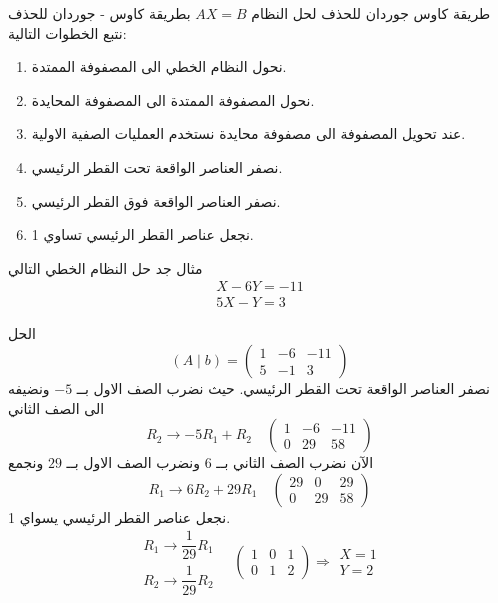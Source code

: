 	\begin{frame}
		\begin{exampleblock}{طريقة كاوس جوردان للحذف}
			لحل النظام $AX=B$ بطريقة كاوس - جوردان للحذف نتبع الخطوات التالية:
			\begin{enumerate}
				\item نحول النظام الخطي الى المصفوفة الممتدة.
				\item نحول المصفوفة الممتدة الى المصفوفة المحايدة.
				\item عند تحويل المصفوفة الى مصفوفة محايدة نستخدم العمليات الصفية الاولية.
				\item نصفر العناصر الواقعة تحت القطر الرئيسي.
				\item نصفر العناصر الواقعة فوق القطر الرئيسي.
				\item نجعل عناصر القطر الرئيسي تساوي 1.
			\end{enumerate}
		\end{exampleblock}
		
		\begin{exampleblock}{مثال}
			جد حل النظام الخطي التالي
			\begin{align*}
				X-6Y = -11\\
				5X - Y = 3
			\end{align*}
		\end{exampleblock}
	\end{frame}
	
	\begin{frame}
		\begin{exampleblock}{الحل}
			\[
			(A\mid b) =
			\left(
			\begin{array}{cc|c}
				1&-6&-11\\
				5&-1&3
			\end{array}
			\right)
			\]
			نصفر العناصر الواقعة تحت القطر الرئيسي. حيث نضرب الصف الاول بــ $-5$ ونضيفه الى الصف الثاني
			\[
			R_2\to-5R_1 + R_2  \quad 
			\left(
			\begin{array}{cc|c}
				1&-6&-11\\
				0&29&58
			\end{array}
			\right)
			\]
			الآن نضرب الصف الثاني بــ $6$ ونضرب الصف الاول بــ $29$ ونجمع
			\[
			R_1 \to 6R_2 + 29R_1 \quad
			\left(
			\begin{array}{cc|c}
				29&0&29\\
				0&29&58
			\end{array}
			\right) 
			\]
			نجعل عناصر القطر الرئيسي يسواي 1.
			\[
			\begin{array}{c}
				R_1 \to \dfrac{1}{29}R_1\\[10pt]
				R_2 \to \dfrac{1}{29}R_2
			\end{array}\quad
			\left(
			\begin{array}{cc|c}
				1&0&1\\
				0&1&2
			\end{array}
			\right) 
			\Rightarrow
			\begin{array}{c}
				X = 1\\
				Y= 2
			\end{array}
			\]
		\end{exampleblock}
	\end{frame}
	
